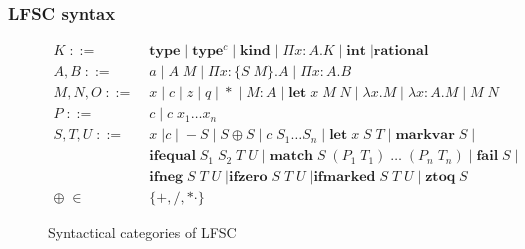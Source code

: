 \documentclass[10pt,t]{beamer}
\newcommand{\pilf}[3]{\Pi #1 : #2. #3}
\begin{document}
\begin{frame}
  \frametitle{LFSC syntax}
\begin{figure}[h!]
\begin{align*}
K \; ::=& \; \mathbf{type} \; | \; \mathbf{type}^c \; | \; \mathbf{kind} \; | \; \pilf{x}{A}{K} \; | \; \mathbf{int} \; | \mathbf{rational} \\
A,B \; ::=& \; a \; | \; A \; M \; | \; \pilf{x}{\{S \; M\}}{A} \; | \; \pilf{x}{A}{B} \\
M,N,O \; ::=& \; x \; | \; c \; | \; z \; | \; q \; | \; * \; | \; M : A \; | \; \mathbf{let} \; x \; M \; N \; | \; \lambda x . M \; | \; \lambda x : A . M \; | \; M \; N \\
P \; ::=& \; c \; | \; c \; x_1 \dots x_n \\
S,T,U \; ::=& \; x \; | c \; | \; - S \; | \; S \oplus S \; | \; c \; S_1 \dots S_n \; | \; \mathbf{let} \; x \; S \; T \; | \; \mathbf{markvar} \; S \; |\\
& \; \mathbf{ifequal} \; S_1 \; S_2 \; T \; U \; | \; \mathbf{match} \; S \; (P_1 \; T_1) \; \dots \; (P_n \; T_n) \; | \; \mathbf{fail} \; S \; |\\
& \; \mathbf{ifneg} \; S \; T \; U \; | \mathbf{ifzero} \; S \; T \; U \; | \mathbf{ifmarked} \; S \; T \; U \; |  \; \mathbf{ztoq} \; S\\
\oplus \; \in& \; \{+, /, *\cdot\}
\end{align*}
\caption{Syntactical categories of LFSC}
\label{fig:lfscsyntax}
\end{figure}
\end{frame}
\end{document}
